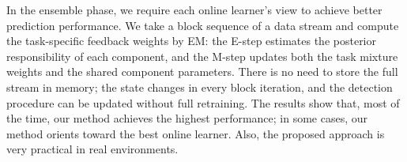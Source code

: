 \documentclass[12pt,a4paper]{article}
\begin{document}
	In the ensemble phase, we require each online learner's view to achieve better prediction performance. We take a block sequence of a data stream and compute the task-specific feedback weights by EM: the E-step estimates the posterior responsibility of each component, and the M-step updates both the task mixture weights and the shared component parameters. There is no need to store the full stream in memory; the state changes in every block iteration, and the detection procedure can be updated without full retraining. The results show that, most of the time, our method achieves the highest performance; in some cases, our method orients toward the best online learner. Also, the proposed approach is very practical in real environments.
	
	
\end{document}
